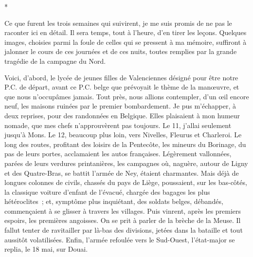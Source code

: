 \documentclass[french,twoside]{book} %
\begin{document}
\begin{center}
*\par
\end{center}

\noindent Ce que furent les trois semaines qui suivirent, je me suis promis de ne pas le raconter ici en détail. Il sera temps, tout à l’heure, d’en tirer les leçons. Quelques images, choisies parmi la foule de celles qui se pressent à ma mémoire, suffiront à jalonner   le cours de ces journées et de ces nuits, toutes remplies par la grande tragédie de la campagne du Nord.\par
Voici, d’abord, le lycée de jeunes filles de Valenciennes désigné pour être notre P.C. de départ, avant ce P.C. belge que prévoyait le thème de la manœuvre, et que nous n’occupâmes jamais. Tout près, nous allions contempler, d’un œil encore neuf, les maisons ruinées par le premier bombardement. Je pus m’échapper, à deux reprises, pour des randonnées en Belgique. Elles plaisaient à mon humeur nomade, que mes chefs n’approuvèrent pas toujours. Le 11, j’allai seulement jusqu’à Mons. Le 12, beaucoup plus loin, vers Nivelles, Fleurus et Charleroi. Le long des routes, profitant des loisirs de la Pentecôte, les mineurs du Borinage, du pas de leurs portes, acclamaient les autos françaises. Légèrement vallonnées, parées de leurs verdures printanières, les campagnes où, naguère, autour de Ligny et des Quatre-Bras, se battit l’armée de Ney, étaient charmantes. Mais déjà de longues colonnes de civils, chassés du pays de Liège, poussaient, sur les bas-côtés, la classique voiture d’enfant de l’évacué, chargée des bagages les plus hétéroclites ; et, symptôme plus inquiétant, des soldats belges, débandés, commençaient à se glisser à travers les villages. Puis vinrent, après les premiers espoirs, les premières angoisses. On se prit à parler de la brèche de la Meuse. Il fallut tenter de ravitailler par là-bas des divisions, jetées dans la bataille et tout aussitôt volatilisées. Enfin, l’armée refoulée vers le Sud-Ouest, l’état-major se replia, le 18 mai, sur Douai.\par
\end{document}
